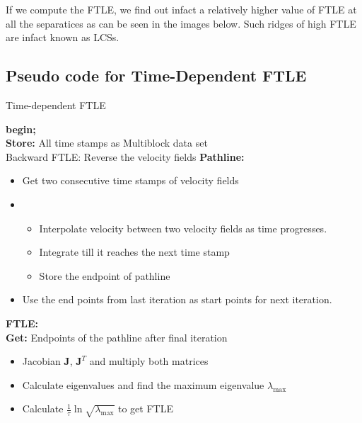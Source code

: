
If we compute the FTLE, we find out infact a relatively higher value of FTLE at all the separatices as can be seen in the images below. Such ridges of high FTLE are infact known as LCSs.

\subsection{Pseudo code for Time-Dependent FTLE}

\begin{algorithm}[H]
\caption{Time-dependent FTLE}
\SetAlgoLined
{}
 \textbf{begin;}\\
 \textbf{Store:} All time stamps as Multiblock data set \\
 {
 	Backward FTLE: Reverse the velocity fields
 }
 \textbf{Pathline:}\\
	{
	\begin{itemize}
		\item Get two consecutive time stamps of velocity fields 
		\item {}
				{
					\begin{itemize}
						\item Interpolate velocity between two velocity fields as time progresses. 
						\item Integrate till it reaches the next time stamp
						\item Store the endpoint of pathline
					\end{itemize}
				}
		\item Use the end points from last iteration as start points for next iteration.
	\end{itemize}
	}
\textbf{FTLE:} \\
	\textbf{Get:} Endpoints of the pathline after final iteration \\
		{
			\begin{itemize}
				\item Jacobian $\textbf{J} $, $\textbf{J}^{T} $ and multiply both matrices
				\item Calculate eigenvalues and find the maximum eigenvalue $ \lambda_{\max} $
				\item Calculate $ \frac{1}{\tau} \ln \sqrt{\lambda_{\max}} $ to get FTLE
			\end{itemize}
		}
\end{algorithm}